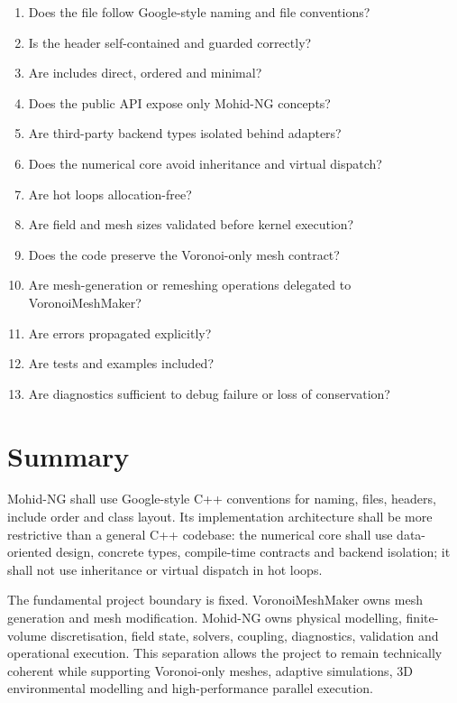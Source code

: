 \documentclass[11pt,a4paper]{article}
\begin{document}
\begin{enumerate}
  \item Does the file follow Google-style naming and file conventions?
  \item Is the header self-contained and guarded correctly?
  \item Are includes direct, ordered and minimal?
  \item Does the public API expose only Mohid-NG concepts?
  \item Are third-party backend types isolated behind adapters?
  \item Does the numerical core avoid inheritance and virtual dispatch?
  \item Are hot loops allocation-free?
  \item Are field and mesh sizes validated before kernel execution?
  \item Does the code preserve the Voronoi-only mesh contract?
  \item Are mesh-generation or remeshing operations delegated to VoronoiMeshMaker?
  \item Are errors propagated explicitly?
  \item Are tests and examples included?
  \item Are diagnostics sufficient to debug failure or loss of conservation?
\end{enumerate}

\section{Summary}

Mohid-NG shall use Google-style C++ conventions for naming, files, headers, include order and class layout. Its implementation architecture shall be more restrictive than a general C++ codebase: the numerical core shall use data-oriented design, concrete types, compile-time contracts and backend isolation; it shall not use inheritance or virtual dispatch in hot loops.

The fundamental project boundary is fixed. VoronoiMeshMaker owns mesh generation and mesh modification. Mohid-NG owns physical modelling, finite-volume discretisation, field state, solvers, coupling, diagnostics, validation and operational execution. This separation allows the project to remain technically coherent while supporting Voronoi-only meshes, adaptive simulations, 3D environmental modelling and high-performance parallel execution.
\end{document}
